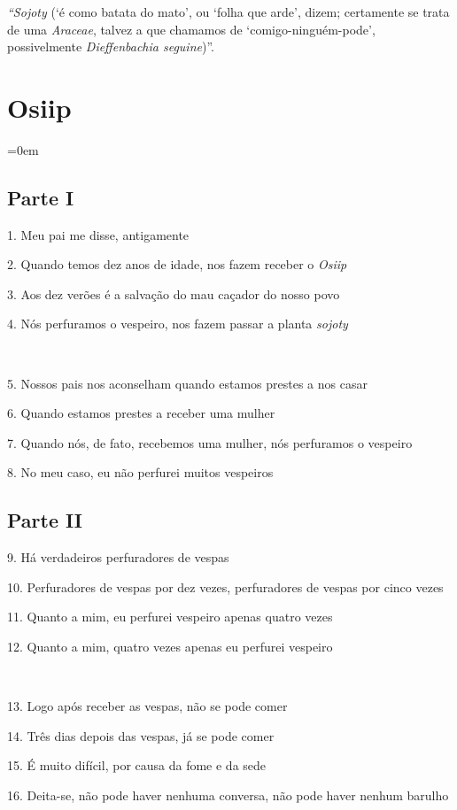 \emph{``Sojoty} (`é como batata do mato', ou `folha que arde',
dizem; certamente se trata de uma \emph{Araceae}, talvez a que chamamos
de `comigo-ninguém-pode', possivelmente \emph{Dieffenbachia
seguine})''.

\chapter*{Osiip}
\begingroup\parindent=0em

\section{Parte I}

1. Meu pai me disse, antigamente

2. Quando temos dez anos de idade, nos fazem receber o \emph{Osiip}

3. Aos dez verões é a salvação do mau caçador do nosso povo

4. Nós perfuramos o vespeiro, nos fazem passar a planta \emph{sojoty}

~

5. Nossos pais nos aconselham quando estamos prestes a nos casar

6. Quando estamos prestes a receber uma mulher

7. Quando nós, de fato, recebemos uma mulher, nós perfuramos o vespeiro

8. No meu caso, eu não perfurei muitos vespeiros

\section{Parte II}

9. Há verdadeiros perfuradores de vespas

10. Perfuradores de vespas por dez vezes, perfuradores de vespas por cinco vezes

11. Quanto a mim, eu perfurei vespeiro apenas quatro vezes

12. Quanto a mim, quatro vezes apenas eu perfurei vespeiro

~

13. Logo após receber as vespas, não se pode comer

14. Três dias depois das vespas, já se pode comer

15. É muito difícil, por causa da fome e da sede

16. Deita-se, não pode haver nenhuma conversa, não pode haver nenhum
barulho

